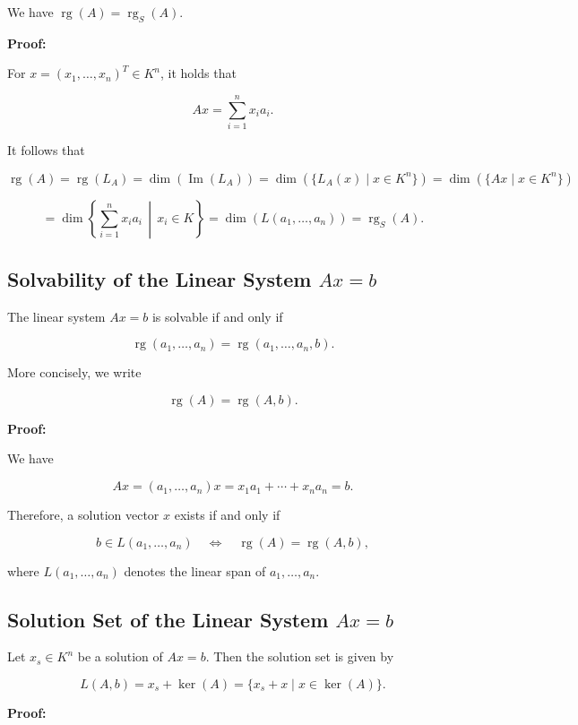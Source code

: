 We have \(\operatorname{rg}(A) = \operatorname{rg}_S(A)\).
\vspace{\baselineskip}

\textbf{Proof:} 

For \(x = {(x_1, \ldots, x_n)}^T \in K^n\), it holds that

\[
	Ax = \sum_{i=1}^{n} x_i a_i.
\]

It follows that

\[
	\operatorname{rg}(A) = \operatorname{rg}(L_A) = \dim(\operatorname{Im}(L_A))
	= \dim\left(\{L_A(x) \mid x \in K^n\}\right)
	= \dim\left(\{Ax \mid x \in K^n\}\right)
\]

\[
	= \dim\left\{ \sum_{i=1}^{n} x_i a_i \,\middle|\, x_i \in K \right\}
	= \dim(L(a_1, \ldots, a_n)) = \operatorname{rg}_S(A).
\]

\subsection{Solvability of the Linear System \texorpdfstring{\(Ax = b\)}{}}

The linear system \(Ax = b\) is solvable if and only if

\[
	\operatorname{rg}(a_1, \ldots, a_n) = \operatorname{rg}(a_1, \ldots, a_n, b).
\]

More concisely, we write

\[
	\operatorname{rg}(A) = \operatorname{rg}(A, b).
\]

\textbf{Proof:} 

We have

\[
	Ax = (a_1, \ldots, a_n)x = x_1 a_1 + \cdots + x_n a_n = b.
\]

Therefore, a solution vector \(x\) exists if and only if

\[
	b \in L(a_1, \ldots, a_n) \quad \Leftrightarrow \quad \operatorname{rg}(A) = \operatorname{rg}(A, b),
\]

where \(L(a_1, \ldots, a_n)\) denotes the linear span of \(a_1, \ldots, a_n\).

\subsection{Solution Set of the Linear System \texorpdfstring{\(Ax = b\)}{}}

Let \(x_s \in K^n\) be a solution of \(Ax = b\). Then the solution set is given by

\[
	L(A, b) = x_s + \ker(A) = \{x_s + x \mid x \in \ker(A)\}.
\]

\textbf{Proof:}

